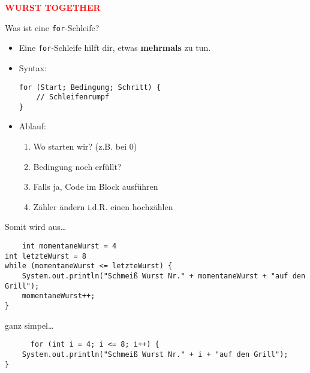 \documentclass{../../presentation}
\begin{document}
\begin{frame}[plain]
    \centering
    {\Huge\bfseries\textcolor{red}{WURST TOGETHER}}
\end{frame}



\begin{frame}[fragile]{Was ist eine \texttt{for}-Schleife?}

  \begin{itemize}
    \item Eine \texttt{for}-Schleife hilft dir, etwas \textbf{mehrmals} zu tun.
    \item Syntax:
      \begin{verbatim}
for (Start; Bedingung; Schritt) {
    // Schleifenrumpf
}
\end{verbatim}
\item Ablauf:
    \begin{enumerate}
    \item Wo starten wir? (z.B. bei 0)
    \item Bedingung noch erfüllt?
    \item Falls ja, Code im Block ausführen
    \item Zähler ändern i.d.R. einen hochzählen
\end{enumerate}
  \end{itemize}
\end{frame}



\begin{frame}[fragile]
  Somit wird aus\dots
  
  \begin{verbatim}
    int momentaneWurst = 4
int letzteWurst = 8
while (momentaneWurst <= letzteWurst) {
	System.out.println("Schmeiß Wurst Nr." + momentaneWurst + "auf den Grill");
	momentaneWurst++;
}
  \end{verbatim}
  ganz simpel\dots
  \begin{verbatim}
      for (int i = 4; i <= 8; i++) {
	System.out.println("Schmeiß Wurst Nr." + i + "auf den Grill");
}
  \end{verbatim}

\end{frame}
\end{document}
